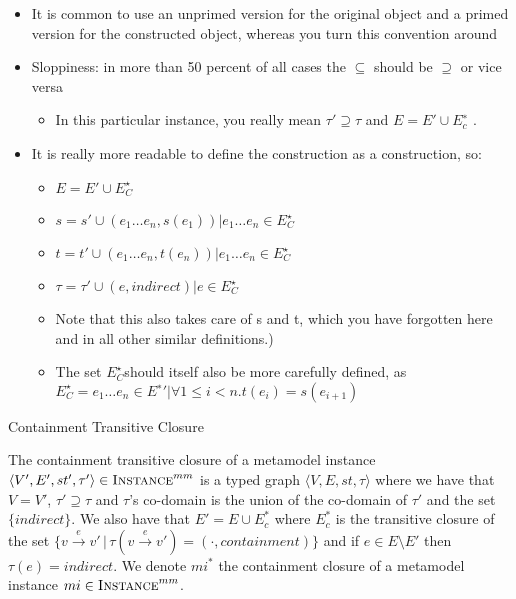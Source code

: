 \begin{itemize}
\item It is common to use an unprimed version for the original object and a
primed version for the constructed object, whereas you turn this convention around
\item Sloppiness: in more than 50 percent of all cases the $\subseteq$ should be $\supseteq$ or vice versa
\begin{itemize}
\item In this particular instance, you really mean $\tau' \supseteq \tau$ and $E = E' \cup E_c^∗$ .
\end{itemize}

\item It is really more readable to define the construction as a construction, so:
\begin{itemize}
\item  $E = E'\cup E^{\star}_{C}$
\item $s = s' \cup {(e_1 \dots e_n , s(e_1)) | e_1 \dots e_n \in E^{\star}_{C} }$
\item $t = t' \cup {(e_1 \dots e_n ,t(e_n )) | e_1 \dots e_n \in E^{\star}_{C} }$
\item $\tau = \tau' \cup {(e, indirect) | e \in E^{\star}_{C} }$
\end{itemize}
\begin{itemize}
\item Note that this also takes care of s and t, which you have forgotten here
and in all other similar definitions.)
\item The set $E^{\star}_{C}$should itself also be more carefully defined, as $E^{\star}_{C} = {e_1 \dots e_n \in E^∗' | \forall1 \leq i < n.t(e_i ) = s(e_{i+1} )}$
\end{itemize}
\end{itemize}


\begin{definition}{Containment Transitive Closure\\}
\label{def:instance_closure}

The containment transitive closure of a metamodel instance $\langle V',E',st',\tau'\rangle\in \textsc{Instance}^{mm}$ is a typed graph $\langle V,E,st,\tau\rangle$ where we have that $V=V'$, $\tau' \supseteq \tau$ and $\tau$'s co-domain is the union of the co-domain of $\tau'$ and the set $\{indirect\}$. We also have that $E' = E\cup E^*_c$ where $E^*_c$ is the transitive closure of the set $\big\{v\xrightarrow{e}v'\,|\,\tau(v\xrightarrow{e}v') = (\cdot,containment)\big\}$ and if $e\in E\setminus E'$ then $\tau(e) = indirect$.  We denote $mi^{*}$ the containment closure of a metamodel instance $mi\in \textsc{Instance}^{mm}$.

\end{definition}


